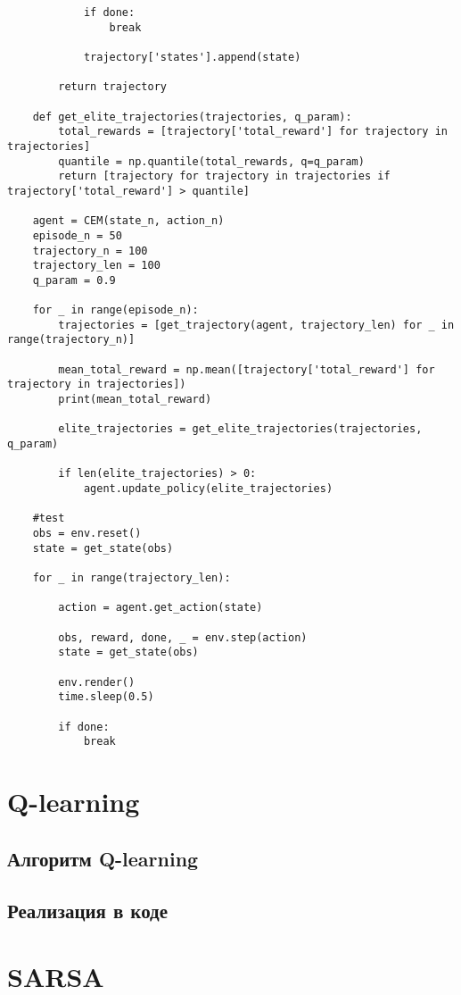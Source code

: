 \begin{lstlisting}
			if done:
				break
		
			trajectory['states'].append(state)
		
		return trajectory
	
	def get_elite_trajectories(trajectories, q_param):
		total_rewards = [trajectory['total_reward'] for trajectory in trajectories]
		quantile = np.quantile(total_rewards, q=q_param) 
		return [trajectory for trajectory in trajectories if trajectory['total_reward'] > quantile]
	
	agent = CEM(state_n, action_n)
	episode_n = 50
	trajectory_n = 100
	trajectory_len = 100
	q_param = 0.9
	
	for _ in range(episode_n):
		trajectories = [get_trajectory(agent, trajectory_len) for _ in range(trajectory_n)]
		
		mean_total_reward = np.mean([trajectory['total_reward'] for trajectory in trajectories])
		print(mean_total_reward)
		
		elite_trajectories = get_elite_trajectories(trajectories, q_param)
		
		if len(elite_trajectories) > 0:
			agent.update_policy(elite_trajectories)
	
	#test
	obs = env.reset()
	state = get_state(obs)
	
	for _ in range(trajectory_len):
	
		action = agent.get_action(state)
		
		obs, reward, done, _ = env.step(action)
		state = get_state(obs)
		
		env.render()
		time.sleep(0.5)
		
		if done:
			break
\end{lstlisting}

\section{Q-learning}

\subsection{Алгоритм Q-learning}

\subsection{Реализация в коде}

\section{SARSA}

